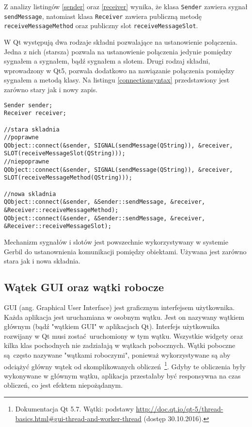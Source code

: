 Z analizy listingów \ref{sender} oraz \ref{receiver} wynika, że klasa \lstinline{Sender} zawiera sygnał \lstinline{sendMessage}, natomiast klasa \lstinline{Receiver} zawiera publiczną metodę \lstinline{receiveMessageMethod} oraz publiczny slot \lstinline{receiveMessageSlot}.

W Qt występują dwa rodzaje składni pozwalające na ustanowienie połączenia. Jedna z nich (starsza) pozwala na ustanowienie połączenia jedynie pomiędzy sygnałem a sygnałem, bądź sygnałem a slotem. Drugi rodzaj składni, wprowadzony w Qt5, pozwala dodatkowo na nawiązanie połączenia pomiędzy sygnałem a metodą klasy. Na listingu \ref{connectionsyntax} przedstawiony jest zarówno stary jak i nowy zapis.

\begin{minipage}{\textwidth}

	\begin{lstlisting}[label=connectionsyntax, caption={Składnia tworzenia połączeń między obiektami},alsoletter={()[].=}]
Sender sender;
Receiver receiver;

//stara skladnia
//poprawne
QObject::connect(&sender, SIGNAL(sendMessage(QString)), &receiver, SLOT(receiveMessageSlot(QString)));
//niepoprawne
QObject::connect(&sender, SIGNAL(sendMessage(QString)), &receiver, SLOT(receiveMessageMethod(QString)));

//nowa skladnia
QObject::connect(&sender, &Sender::sendMessage, &receiver, &Receiver::receiveMessageMethod);
QObject::connect(&sender, &Sender::sendMessage, &receiver, &Receiver::receiveMessageSlot);
	\end{lstlisting}
\end{minipage}

Mechanizm sygnałów i slotów jest powszechnie wykorzystywany w systemie Gerbil do ustanownienia komunikacji pomiędzy obiektami. Używana jest zarówno stara jak i nowa składnia.

\subsection{Wątek GUI oraz wątki robocze}
GUI (ang. Graphical User Interface) jest graficznym interfejsem użytkownika. Każda aplikacja jest uruchamiana w osobnym wątku. Jest on nazywany wątkiem głównym (bądź "wątkiem GUI" w aplikacjach Qt). Interfejs użytkownika rozwijany w Qt musi zostać uruchomiony w tym wątku. Wszystkie widgety oraz kilka klas pochodnych nie zadziałają w wątkach pobocznych. Wątki poboczne są często nazywane "wątkami roboczymi", ponieważ wykorzystywane są aby odciążyć główny wątek od skomplikowanych obliczeń~\footnote{Dokumentacja Qt 5.7. Wątki: podstawy \url{http://doc.qt.io/qt-5/thread-basics.html\#gui-thread-and-worker-thread} (dostęp 30.10.2016).}. Gdyby te obliczenia były wykonywane w głównym wątku, aplikacja przestałaby być responsywna na czas obliczeń, co jest efektem niepożądanym.

